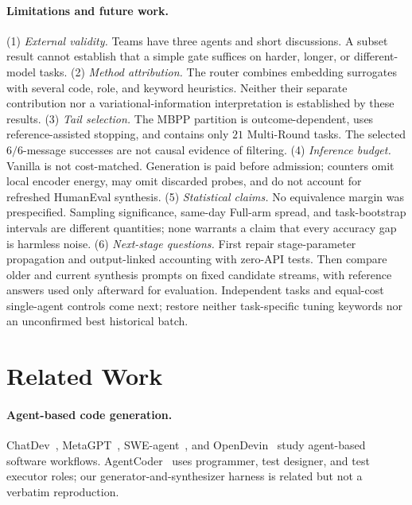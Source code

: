 \documentclass[11pt,twoside,twocolumn,letterpaper]{article}
\begin{document}
\paragraph{Limitations and future work.}
(1) \emph{External validity.} Teams have three agents and short discussions. A subset result cannot establish that a simple gate suffices on harder, longer, or different-model tasks.
(2) \emph{Method attribution.} The router combines embedding surrogates with several code, role, and keyword heuristics. Neither their separate contribution nor a variational-information interpretation is established by these results.
(3) \emph{Tail selection.} The MBPP partition is outcome-dependent, uses reference-assisted stopping, and contains only $21$ Multi-Round tasks. The selected $6/6$-message successes are not causal evidence of filtering.
(4) \emph{Inference budget.} Vanilla is not cost-matched. Generation is paid before admission; counters omit local encoder energy, may omit discarded probes, and do not account for refreshed HumanEval synthesis.
(5) \emph{Statistical claims.} No equivalence margin was prespecified. Sampling significance, same-day Full-arm spread, and task-bootstrap intervals are different quantities; none warrants a claim that every accuracy gap is harmless noise.
(6) \emph{Next-stage questions.} First repair stage-parameter propagation and output-linked accounting with zero-API tests. Then compare older and current synthesis prompts on fixed candidate streams, with reference answers used only afterward for evaluation. Independent tasks and equal-cost single-agent controls come next; restore neither task-specific tuning keywords nor an unconfirmed best historical batch.

\section{Related Work}
\paragraph{Agent-based code generation.} ChatDev~\cite{qian2023chatdev}, MetaGPT~\cite{hong2023metagpt}, SWE-agent~\cite{yang2024sweagent}, and OpenDevin~\cite{wang2024opendevin} study agent-based software workflows. AgentCoder~\cite{du2023agentcoder} uses programmer, test designer, and test executor roles; our generator-and-synthesizer harness is related but not a verbatim reproduction.
\end{document}
